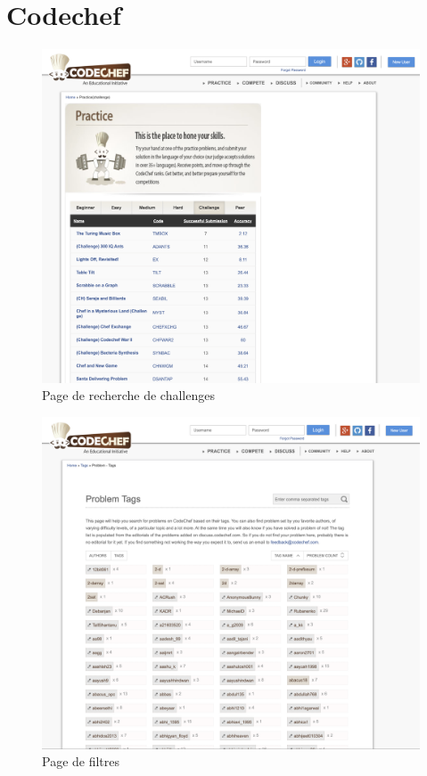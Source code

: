 \section{Codechef}

\begin{figure}[H]
    \includegraphics[width=\textwidth,height=0.6\textheight,keepaspectratio]{images/comparison/codechef-1.png}
    \centering
    \caption[Codechef : page de recherche de challenges]{Page de recherche de challenges}
\end{figure}

\begin{figure}[H]
    \includegraphics[width=\textwidth,height=0.45\textheight,keepaspectratio]{images/comparison/codechef-2.png}
    \centering
    \caption[Codechef : page de filtres]{Page de filtres}
\end{figure}

